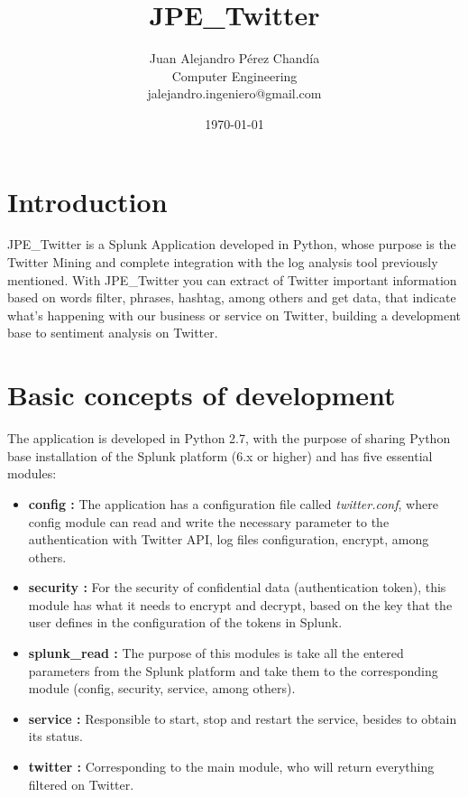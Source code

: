 \documentclass[report]{article}
\title{JPE\_Twitter} %
\author{%
    Juan Alejandro P\'erez Chand\'ia \\
    Computer Engineering\\
    jalejandro.ingeniero@gmail.com
}
\date{\today}
\begin{document}
\renewcommand*\contentsname{\color{skde}Contents}
\pagecolor{background}
\color{text}
\sloppy 


\addtocounter{page}{1}

\section{Introduction}
JPE\_Twitter is a Splunk Application developed in Python, whose purpose is the Twitter Mining and complete integration with the log analysis tool previously mentioned. With JPE\_Twitter you can extract of Twitter important information based on words filter,
phrases, hashtag, among others and get data, that indicate what’s happening with our business or service on Twitter, building a development base to sentiment analysis on Twitter.
\newpage
\tableofcontents
\thispagestyle{empty}

\newpage
\section{Basic concepts of development}

The application is developed in Python 2.7, with the purpose of sharing Python base installation of the Splunk platform (6.x or higher) and has five essential modules:
\newline
\begin{itemize}
\item {\bf config :} The application has a configuration file called \textit{twitter.conf}, where config module can read and write the necessary parameter to the authentication with Twitter API, log files configuration, encrypt, among others.

\item {\bf security :} For the security of confidential data (authentication token), this module has what it needs to encrypt and decrypt, based on the key that the user defines in the configuration of the tokens in Splunk.

\item {\bf splunk\_read :} The purpose of this modules is take all the entered parameters from the Splunk platform and take them to the corresponding module (config, security, service, among others).

\item {\bf service :} Responsible to start, stop and restart the service, besides to obtain its status.

\item {\bf twitter :} Corresponding to the main module, who will return everything filtered on Twitter.
\newline
\end{itemize}
\end{document}
